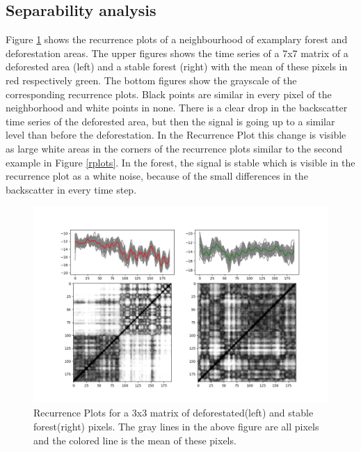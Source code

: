 \documentclass{article}
\begin{document}
\subsection{Separability analysis}

Figure \ref{rpforest} shows the recurrence plots of a neighbourhood of examplary forest and deforestation areas.
The upper figures shows the time series of a 7x7 matrix of a deforested area (left) and a stable forest (right) with the mean of these pixels in red respectively green.
The bottom figures show the grayscale of the corresponding recurrence plots.
Black points are similar in every pixel of the neighborhood and white points in none.
There is a clear drop in the backscatter time series of the deforested area, but then the signal is going up to a similar level than before the deforestation.
In the Recurrence Plot this change is visible as large white areas in the corners of the recurrence plots similar to the second example in Figure \ref{rplots}.
In the forest, the signal is stable which is visible in the recurrence plot as a white noise, because of the small differences in the backscatter in every time step.


\begin{figure}
  \includegraphics[width=\textwidth]{figs/S1_Hidalgo_timestack_20km_VH___lin_20_test_tandemdem12_emd__rp_deffor_3.png}
  \caption{Recurrence Plots for a 3x3 matrix of deforestated(left) and stable forest(right) pixels.
           The gray lines in the above figure are all pixels and the colored line is the mean of these pixels.}
  \label{rpforest}
\end{figure}
\end{document}
